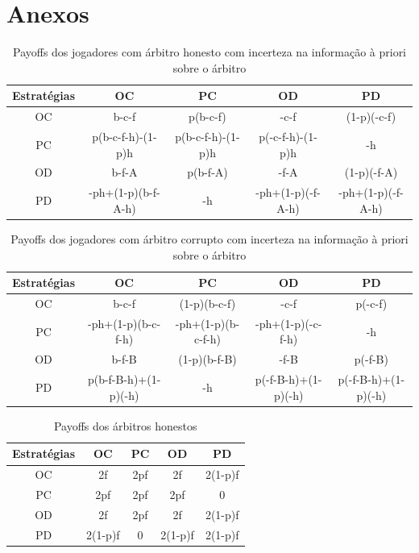 \documentclass[conference, twocolumn]{IEEEtran}
\theoremstyle{plain}
\theoremstyle{definition}
\theoremstyle{remark}
\begin{document}
    
    

    \onecolumn

    \section{Anexos} \label{Anexos}
    \begin{table}[h]
        \centering
        \begin{tabular}{c|cccc}
            Estratégias&OC&PC&OD&PD\\
            \hline
            OC & b-c-f & p(b-c-f)          & -c-f & (1-p)(-c-f)\\
            PC & p(b-c-f-h)-(1-p)h & p(b-c-f-h)-(1-p)h & p(-c-f-h)-(1-p)h & -h\\
            OD & b-f-A & p(b-f-A)          & -f-A & (1-p)(-f-A)\\
            PD & -ph+(1-p)(b-f-A-h) & -h & -ph+(1-p)(-f-A-h) & -ph+(1-p)(-f-A-h)\\
        \end{tabular}
        \caption{Payoffs dos jogadores com árbitro honesto com incerteza na informação à priori sobre o árbitro}
    \end{table}

    \begin{table}[h]
        \centering
        \begin{tabular}{c|cccc}
            Estratégias&OC&PC&OD&PD\\
            \hline
            OC & b-c-f & (1-p)(b-c-f)       & -c-f & p(-c-f)\\
            PC & -ph+(1-p)(b-c-f-h)   & -ph+(1-p)(b-c-f-h) & -ph+(1-p)(-c-f-h)   & -h\\
            OD & b-f-B & (1-p)(b-f-B)       & -f-B & p(-f-B)\\
            PD & p(b-f-B-h)+(1-p)(-h) & -h & p(-f-B-h)+(1-p)(-h) & p(-f-B-h)+(1-p)(-h)\\
        \end{tabular}
        \caption{Payoffs dos jogadores com árbitro corrupto com incerteza na informação à priori sobre o árbitro}
    \end{table}

    \begin{table}[h]
        \centering
        \begin{tabular}{c|cccc}
            Estratégias&OC&PC&OD&PD\\
            \hline
            OC & 2f & 2pf & 2f & 2(1-p)f\\
            PC & 2pf & 2pf & 2pf & 0\\
            OD & 2f & 2pf & 2f & 2(1-p)f\\
            PD & 2(1-p)f & 0 & 2(1-p)f & 2(1-p)f\\
        \end{tabular}
        \caption{Payoffs dos árbitros honestos}
    \end{table}
\end{document}

